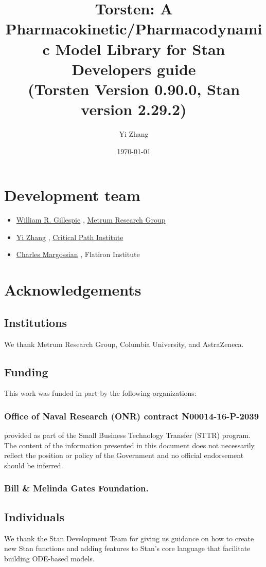 \documentclass[12pt, reqno, oneside]{amsbook}
\author{Yi Zhang}
\date{\today}
\title{Torsten: A Pharmacokinetic/Pharmacodynamic Model Library for Stan\\\medskip
\large Developers guide \\  (Torsten Version 0.90.0, Stan version 2.29.2)}
\numberwithin{equation}{chapter}
\numberwithin{figure}{chapter}
\numberwithin{table}{chapter}
\theoremstyle{remark}
\begin{document}
\maketitle
\tableofcontents


\chapter*{Development team}
\label{sec:org9bb72d8}
\begin{itemize}
\item \href{mailto:billg@metrumrg.com}{William R. Gillespie} , \href{https://www.metrumrg.com/}{Metrum Research Group}
\item \href{mailto:yz@yizh.org}{Yi Zhang} , \href{https://www.c-path.org/}{Critical Path Institute}
\item \href{mailto:cmargossian@flatironinstitute.org}{Charles Margossian} , Flatiron Institute
\end{itemize}
\chapter*{Acknowledgements}
\label{sec:org4fd8ba7}
\section*{Institutions}
\label{sec:orgc7e58d4}
We thank Metrum Research Group, Columbia University, and AstraZeneca.
\section*{Funding}
\label{sec:org209e741}
This work was funded in part by the following organizations:
\subsection*{Office of Naval Research (ONR) contract N00014-16-P-2039}
\label{sec:orgee502e1}
provided as part of the Small Business Technology Transfer (STTR)
program. The content of the information presented in this document
does not necessarily reflect the position or policy of the
Government and no official endorsement should be inferred.
\subsection*{Bill \& Melinda Gates Foundation.}
\label{sec:orgb66b095}
\section*{Individuals}
\label{sec:org431c2f6}
We thank the Stan Development Team for giving us guidance on how to
create new Stan functions and adding features to Stan's core language
that facilitate building ODE-based models.
\end{document}
